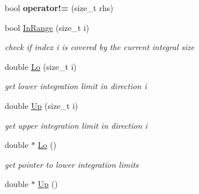 \begin{DoxyCompactItemize}
\item 
\hypertarget{classIntegral_affe5fc13694efa8b91f1aa4266ca23c3}{}bool {\bfseries operator!=} (size\+\_\+t rhs)\label{classIntegral_affe5fc13694efa8b91f1aa4266ca23c3}

\item 
\hypertarget{classIntegral_a7b7f60c30e769eedb0d7ecbf5f393fa0}{}bool \hyperlink{classIntegral_a7b7f60c30e769eedb0d7ecbf5f393fa0}{In\+Range} (size\+\_\+t i)\label{classIntegral_a7b7f60c30e769eedb0d7ecbf5f393fa0}

\begin{DoxyCompactList}\small\item\em check if index i is covered by the current integral size \end{DoxyCompactList}\item 
\hypertarget{classIntegral_a3cb1093faf75a75b2024d865dc1e1d4a}{}double \hyperlink{classIntegral_a3cb1093faf75a75b2024d865dc1e1d4a}{Lo} (size\+\_\+t i)\label{classIntegral_a3cb1093faf75a75b2024d865dc1e1d4a}

\begin{DoxyCompactList}\small\item\em get lower integration limit in direction i \end{DoxyCompactList}\item 
\hypertarget{classIntegral_a44b55ae610a5910d706acd88d13896da}{}double \hyperlink{classIntegral_a44b55ae610a5910d706acd88d13896da}{Up} (size\+\_\+t i)\label{classIntegral_a44b55ae610a5910d706acd88d13896da}

\begin{DoxyCompactList}\small\item\em get upper integration limit in direction i \end{DoxyCompactList}\item 
\hypertarget{classIntegral_a891fceeeac3a1c8475955c91fddfc69d}{}double $\ast$ \hyperlink{classIntegral_a891fceeeac3a1c8475955c91fddfc69d}{Lo} ()\label{classIntegral_a891fceeeac3a1c8475955c91fddfc69d}

\begin{DoxyCompactList}\small\item\em get pointer to lower integration limits \end{DoxyCompactList}\item 
\hypertarget{classIntegral_a8610f52e6f7540048afa5714fd5f6748}{}double $\ast$ \hyperlink{classIntegral_a8610f52e6f7540048afa5714fd5f6748}{Up} ()\label{classIntegral_a8610f52e6f7540048afa5714fd5f6748}


\end{DoxyCompactItemize}
